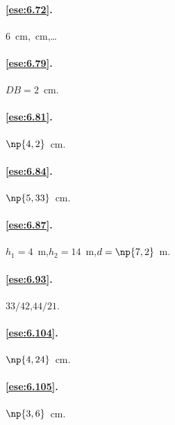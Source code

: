 \paragraph{\ref{ese:6.72}.}
6~cm,~cm,\quad \ldots{}

\paragraph{\ref{ese:6.79}.}
$DB=2$~cm.

\paragraph{\ref{ese:6.81}.}
$\np{4,2}$~cm.

\paragraph{\ref{ese:6.84}.}
$\np{5,33}$~cm.

\paragraph{\ref{ese:6.87}.}
$h_1=4$~m,\quad $h_2=14$~m,\quad $d=\np{7,2}$~m.

\paragraph{\ref{ese:6.93}.}
$33/42$,\quad $44/21$.

\paragraph{\ref{ese:6.104}.}
$\np{4,24}$~cm.

\paragraph{\ref{ese:6.105}.}
$\np{3,6}$~cm.

\endgroup

